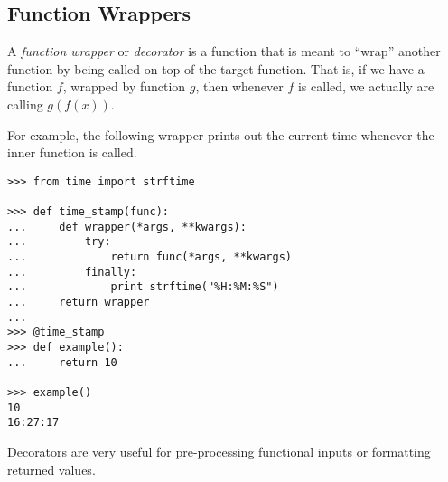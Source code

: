 \subsection*{Function Wrappers} %

A \emph{function wrapper} or \emph{decorator} is a function that is meant to ``wrap'' another function by being called on top of the target function.
That is, if we have a function $f$, wrapped by function $g$, then whenever $f$ is called, we actually are calling $g(f(x))$.

For example, the following wrapper prints out the current time whenever the inner function is called.

\begin{lstlisting}
>>> from time import strftime

>>> def time_stamp(func):
...     def wrapper(*args, **kwargs):
...         try:
...             return func(*args, **kwargs)
...         finally:
...             print strftime("%H:%M:%S")
...     return wrapper
...
>>> @time_stamp
>>> def example():
...     return 10

>>> example()
10
16:27:17
\end{lstlisting}


Decorators are very useful for pre-processing functional inputs or formatting returned values.

